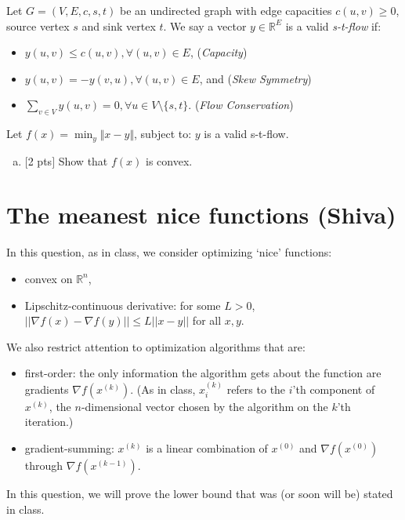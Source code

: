 \documentclass[12pt]{article}
\begin{document}
\noindent Let $G = (V,E,c,s,t)$ be an undirected graph with edge capacities $c(u,v) \ge 0$, source vertex $s$ and sink vertex $t$.  We say a vector $y\in\mathbb{R}^E$ is a valid {\em s-t-flow} if:
\begin{itemize}
\item $y(u,v) \le c(u,v), \forall (u,v)\in E$, ({\em Capacity})
\item $y(u,v) = -y(v,u), \forall (u,v)\in E$, and ({\em Skew Symmetry})
\item $\sum_{v\in V} y(u,v) = 0, \forall u\in V\setminus\{s,t\}$. ({\em Flow Conservation})
\end{itemize}
Let $f(x) = \min_y \Vert x - y \Vert$, subject to: $y$ is a valid s-t-flow.
\begin{enumerate}[(b)]
\item
$[$2 pts$]$  Show that $f(x)$ is convex.
\end{enumerate}

\newpage
\clearpage


\section{The meanest nice functions (Shiva)}

In this question, as in class, we consider optimizing `nice' functions: \begin{itemize}
\item convex on $\mathbb{R}^n$,
\item Lipschitz-continuous derivative: for some $L > 0$, $||\nabla f(x) - \nabla f(y)|| \leq L ||x - y||$ for all $x,y$.
\end{itemize}
We also restrict attention to optimization algorithms that are:
\begin{itemize}
\item first-order: the only information the algorithm gets about the function are gradients $\nabla f(x^{(k)})$. (As in class, $x^{(k)}_i$ refers to the $i$'th component of $x^{(k)}$, the $n$-dimensional vector chosen by the algorithm on the $k$'th iteration.)
\item gradient-summing: $x^{(k)}$ is a linear combination of $x^{(0)}$ and $\nabla f(x^{(0)})$ through $\nabla f(x^{(k-1)})$. 
\end{itemize}
In this question, we will prove the lower bound that was (or soon will be) stated in class.
\end{document}
